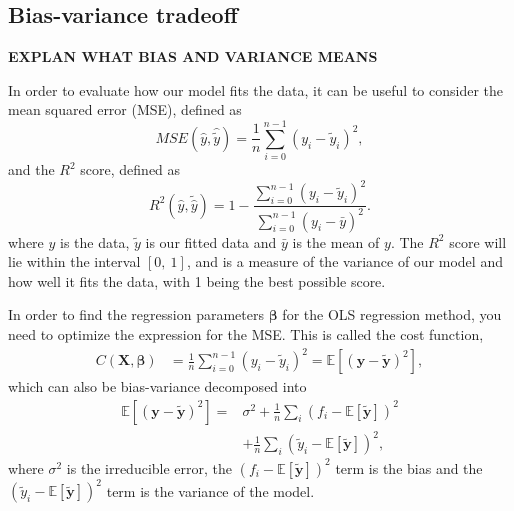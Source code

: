 \documentclass[a4paper, 10pt]{article}
\begin{document}
\begin{multicols}{2}
\subsection{Bias-variance tradeoff}
\textbf{EXPLAN WHAT BIAS AND VARIANCE MEANS}

In order to evaluate how our model fits the data, it can be useful to consider the mean squared error (MSE), defined as
\begin{equation}
    MSE(\hat{y},\hat{\tilde{y}}) = \frac{1}{n}
    \sum_{i=0}^{n-1}(y_i-\tilde{y}_i)^2,
    \label{eq:MSE}
\end{equation}
and the $R^2$ score, defined as
\begin{equation}
    R^2(\hat{y}, \tilde{\hat{y}}) = 1 - \frac{\sum_{i=0}^{n - 1} (y_i - \tilde{y}_i)^2}{\sum_{i=0}^{n - 1} (y_i - \bar{y})^2}.
    \label{eq:R2}
\end{equation}
where $y$ is the data, $\tilde{y}$ is our fitted data and $\bar{y}$ is the mean of $y$.  The $R^2$ score will lie within the interval $[0,\ 1]$, and is a measure of the variance of our model and how well it fits the data, with 1 being the best possible score.

In order to find the regression parameters $\bm{\beta}$ for the OLS regression method, you need to  optimize the expression for the MSE. This is called the cost function,
\begin{align*}
C(\bm{X},\bm{\beta} ) &= \frac{1}{n}\sum_{i=0}^{n-1}(y_i-\tilde{y}_i)^2 = \mathbb{E}[	(\bm{y}-\bm{\tilde{y}})^2],
\end{align*}
which can also be bias-variance decomposed into
\begin{align}
 \mathbb{E}[	(\bm{y}-\bm{\tilde{y}})^2]  =&\sigma^2 + \frac{1}{n}\sum_i(f_i-\mathbb{E}\left[\bm{\tilde{y}}\right])^2  \nonumber \\
 &+ \frac{1}{n}\sum_i(\tilde{y}_i-\mathbb{E}\left[\bm{\tilde{y}}\right])^2,
 \label{eq:biasvariance}
\end{align}
where $\sigma^2$ is the irreducible error,  the $(f_i-\mathbb{E}\left[\bm{\tilde{y}}\right])^2$ term is the bias and the $(\tilde{y}_i-\mathbb{E}\left[\bm{\tilde{y}}\right])^2$ term is the variance of the model.


\end{multicols}
\end{document}
